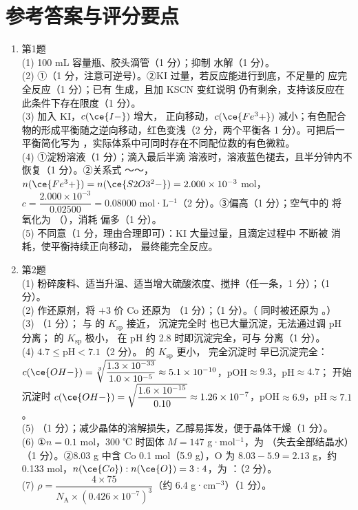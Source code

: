 \documentclass[UTF8,a4paper,zihao=5,oneside,openany,fontset=none]{ctexbook}
\def\rho{ρ}\def\lambda{λ}\def\mu{μ}\def\theta{θ}%
\newenvironment{jiexilist}{\small\begin{enumerate}[label={\textbf{\arabic*}.},leftmargin=1.6em,itemsep=0.3em,topsep=0.2em]}{\end{enumerate}}
\newcommand{\zhangmo}[1]{\par\Needspace{6\baselineskip}\section*{#1}\addcontentsline{toc}{section}{#1}}
\begin{document}
\zhangmo{参考答案与评分要点}
\begin{jiexilist}
\item 第1题\\
(1) 100 mL 容量瓶、胶头滴管（1 分）；抑制  水解（1 分）。\\
(2) ①（1 分，注意可逆号）。②KI 过量，若反应能进行到底，不足量的  应完全反应（1 分）；已有  生成，且加 KSCN 变红说明  仍有剩余，支持该反应在此条件下存在限度（1 分）。\\
(3) 加入 KI，$c(\ce{I-})$ 增大， 正向移动，$c(\ce{Fe^3+})$ 减小；有色配合物的形成平衡随之逆向移动，红色变浅（2 分，两个平衡各 1 分）。可把后一平衡简化写为 ，实际体系中可同时存在不同配位数的有色微粒。\\
(4) ①淀粉溶液（1 分）；滴入最后半滴  溶液时，溶液蓝色褪去，且半分钟内不恢复（1 分）。②关系式 ～～，$n(\ce{Fe^3+})=n(\ce{S2O3^2-})=2.000\times10^{-3}$ mol，$c=\dfrac{2.000\times10^{-3}}{0.02500}=0.08000$ mol·L$^{-1}$（2 分）。③偏高（1 分）；空气中的  将  氧化为 （），消耗  偏多（1 分）。\\
(5) 不同意（1 分，理由合理即可）：KI 大量过量，且滴定过程中  不断被  消耗，使平衡持续正向移动， 最终能完全反应。

\item 第2题\\
(1) 粉碎废料、适当升温、适当增大硫酸浓度、搅拌（任一条，1 分）；（1 分）。\\
(2) 作还原剂，将 $+3$ 价 Co 还原为 （1 分）；（1 分）。（ 同时被还原为 。）\\
(3) （1 分）； 与  的 $K_\text{sp}$ 接近， 沉淀完全时  也已大量沉淀，无法通过调 pH 分离； 的 $K_\text{sp}$ 极小， 在 pH 约 2.8 时即沉淀完全，可与  分离（1 分）。\\
(4) $4.7\le$pH$<7.1$（2 分）。 的 $K_\text{sp}$ 更小， 完全沉淀时  早已沉淀完全：$c(\ce{OH-})=\sqrt[3]{\dfrac{1.3\times10^{-33}}{1.0\times10^{-5}}}\approx5.1\times10^{-10}$，pOH$\approx9.3$，pH$\approx4.7$； 开始沉淀时 $c(\ce{OH-})=\sqrt{\dfrac{1.6\times10^{-15}}{0.10}}\approx1.26\times10^{-7}$，pOH$\approx6.9$，pH$\approx7.1$。\\
(5) （1 分）；减少晶体的溶解损失，乙醇易挥发，便于晶体干燥（1 分）。\\
(6) ①$n=0.1$ mol，300 ℃ 时固体 $M=147$ g·mol$^{-1}$，为 （失去全部结晶水）（1 分）。②8.03 g 中含 Co 0.1 mol（5.9 g），O 为 $8.03-5.9=2.13$ g，约 0.133 mol，$n(\ce{Co}):n(\ce{O})=3:4$，为 ：（2 分）。\\
(7) $\rho=\dfrac{4\times75}{N_\text{A}\times(0.426\times10^{-7})^3}$（约 6.4 g·cm$^{-3}$）（1 分）。


\end{jiexilist}
\end{document}
